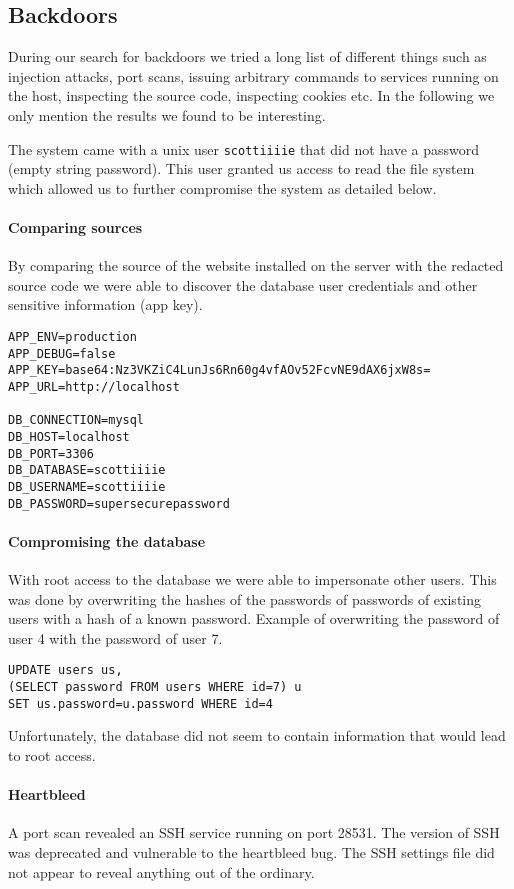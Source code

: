 \documentclass{article}
\begin{document}
\subsection{Backdoors}
During our search for backdoors we tried a long list of different things such as injection attacks, port scans, 
issuing arbitrary commands to services running on the host, inspecting the source code, inspecting cookies etc. 
In the following we only mention the results we found to be interesting.

The system came with a unix user \texttt{scottiiiie} that did not have a password (empty string password).
This user granted us access to read the file system which allowed us to further compromise the system as detailed below.

\paragraph{Comparing sources}
By comparing the source of the website installed on the server with the redacted source code we were able to discover the database user credentials and other sensitive information (app key).
\begin{verbatim}
APP_ENV=production
APP_DEBUG=false
APP_KEY=base64:Nz3VKZiC4LunJs6Rn60g4vfAOv52FcvNE9dAX6jxW8s=
APP_URL=http://localhost

DB_CONNECTION=mysql
DB_HOST=localhost
DB_PORT=3306
DB_DATABASE=scottiiiie
DB_USERNAME=scottiiiie
DB_PASSWORD=supersecurepassword
\end{verbatim}

\paragraph{Compromising the database}
With root access to the database we were able to impersonate other users.
This was done by overwriting the hashes of the passwords of passwords of existing users with a hash of a known password.
Example of overwriting the password of user 4 with the password of user 7.
\begin{verbatim}
UPDATE users us,
(SELECT password FROM users WHERE id=7) u 
SET us.password=u.password WHERE id=4
\end{verbatim}
Unfortunately, the database did not seem to contain information that would lead to root access.

\paragraph{Heartbleed}
A port scan revealed an SSH service running on port 28531. 
The version of SSH was deprecated and vulnerable to the heartbleed bug.
The SSH settings file did not appear to reveal anything out of the ordinary.
\end{document}
